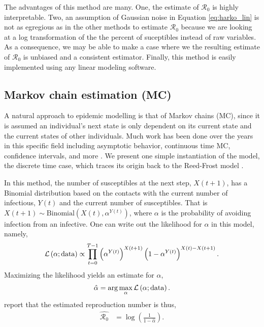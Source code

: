 \documentclass[12pt]{article}
\newcommand{\rr}{\ensuremath{\mathcal{R}_0}}
\begin{document}
The advantages of this method are many.  One, the estimate of $\rr$ is highly interpretable.  Two, an assumption of Gaussian noise in Equation \ref{eq:harko_lin} is not as egregious as in the other methods to estimate $\rr$ because we are looking at a log transformation of the the percent of suceptibles instead of raw variables.  As a consequence, we may be able to make a case where we the resulting estimate of $\rr$ is unbiased and a consistent estimator.  Finally,  this method is easily implemented using any linear modeling software.  

\subsection{Markov chain estimation (MC)}
A natural approach to epidemic modelling is that of Markov chains (MC), since it is assumed an individual's next state is only dependent on its current state and the current states of other individuals.  Much work has been done over the years in this specific field including asymptotic behavior, continuous time MC, confidence intervals, and more \citep{jacquez1991,gani1995,daley2001epidemic}.  We present one simple instantiation of the model, the discrete time case, which traces its origin back to the Reed-Frost model \citep{abbey1952}.

In this method, the number of susceptibles at the next step, $X(t+1)$, has a Binomial distribution based on the contacts with the current number of infectious, $Y(t)$ and the current number of susceptibles.  That is $X(t+1) \sim \text{Binomial}\left(X(t), \alpha^{Y(t)}\right)$, where $\alpha$ is the probability of avoiding infection from an infective.  One can write out the likelihood for $\alpha$ in this model, namely,
\begin{align*}
\mathcal{L}\left ( \alpha ; \textnormal{data}\right ) \propto \prod_{t=0}^{T-1}\left ( \alpha^{Y(t)} \right )^{X(t+1)} \left (1- \alpha^{Y(t)} \right )^{X(t) - X(t+1)}.
\end{align*}
Maximizing the likelihood yields an estimate for $\alpha$,
\begin{align*}
\hat{\alpha} = \arg \max_{\alpha} \mathcal{L}\left(\alpha; \textnormal{data} \right ).
  \end{align*}
 \cite{barbour2004} report that the estimated reproduction number is thus,
\begin{align}\label{eq:r0-mc}
\hat{\rr} &= \log \left ( \frac{1}{1-\hat{\alpha}}\right ).
\end{align}
\end{document}
